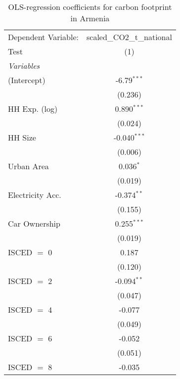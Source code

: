 
\begin{table}[htbp!]
   \centering
   \small
   \begin{adjustbox}{width = 1\textwidth, max height = 0.95\textheight, center}
      \begin{threeparttable}[b]
         \caption{\label{tab:OLS_2_ARM} OLS-regression coefficients for carbon footprint in Armenia}
         \begin{tabular}{lc}
            \tabularnewline \midrule \midrule
            Dependent Variable: & scaled\_CO2\_t\_national\\     
            Test                & (1)\\  
            \midrule
            \emph{Variables}\\
            (Intercept)         & -6.79$^{***}$\\   
                                & (0.236)\\   
            HH Exp. (log)       & 0.890$^{***}$\\   
                                & (0.024)\\   
            HH Size             & -0.040$^{***}$\\   
                                & (0.006)\\   
            Urban Area          & 0.036$^{*}$\\   
                                & (0.019)\\   
            Electricity Acc.    & -0.374$^{**}$\\   
                                & (0.155)\\   
            Car Ownership       & 0.255$^{***}$\\   
                                & (0.019)\\   
            ISCED $=$ 0         & 0.187\\   
                                & (0.120)\\   
            ISCED $=$ 2         & -0.094$^{**}$\\   
                                & (0.047)\\   
            ISCED $=$ 4         & -0.077\\   
                                & (0.049)\\   
            ISCED $=$ 6         & -0.052\\   
                                & (0.051)\\   
            ISCED $=$ 8         & -0.035\\   

\end{tabular}
\end{threeparttable}
\end{adjustbox}
\end{table}
